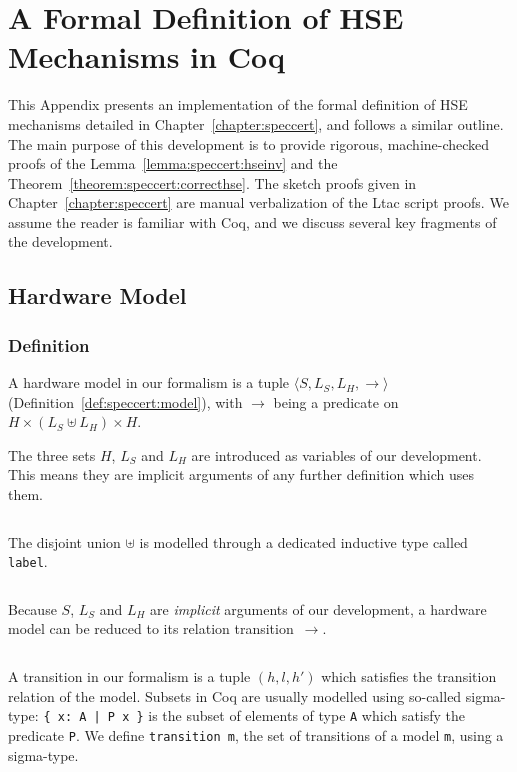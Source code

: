 \chapter{A Formal Definition of HSE Mechanisms in Coq}
\label{appendix:speccert}

This Appendix presents an implementation of the formal definition of HSE
mechanisms detailed in Chapter~\ref{chapter:speccert}, and follows a similar
outline.
%
The main purpose of this development is to provide rigorous, machine-checked
proofs of the Lemma~\ref{lemma:speccert:hseinv} and the
Theorem~\ref{theorem:speccert:correcthse}.
%
The sketch proofs given in Chapter~\ref{chapter:speccert} are manual
verbalization of the {\sc Ltac} script proofs.
%
We assume the reader is familiar with Coq, and we discuss several key fragments
of the development.

\section{Hardware Model}

\subsection{Definition}

A hardware model in our formalism is a tuple
$\langle S, L_S, L_H, \rightarrow \rangle$
(Definition~\ref{def:speccert:model}), with $\rightarrow$ being a predicate on
$H \times (L_S \uplus L_H) \times H$.

The three sets $H$, $L_S$ and $L_H$ are introduced as variables of our
development.
%
This means they are implicit arguments of any further definition which uses
them.

\inputminted[gobble=2,firstline=2,lastline=2]{coq}{Listings/SpecCert.v}

The disjoint union $\uplus$ is modelled through a dedicated inductive type
called \texttt{label}.

\inputminted[gobble=2,firstline=4,lastline=8]{coq}{Listings/SpecCert.v}

Because $S$, $L_S$ and $L_H$ are \emph{implicit} arguments of our development, a
hardware model can be reduced to its relation transition~$\rightarrow$.

\inputminted[gobble=2,firstline=10,lastline=12]{coq}{Listings/SpecCert.v}

A transition in our formalism is a tuple $(h, l, h')$ which satisfies the
transition relation of the model.
%
Subsets in Coq are usually modelled using so-called sigma-type:
%
\texttt{\{ x: A | P x \}} is the subset of elements of type \texttt{A} which
satisfy the predicate \texttt{P}.
%
We define \texttt{transition m}, the set of transitions of a model \texttt{m},
using a sigma-type.

